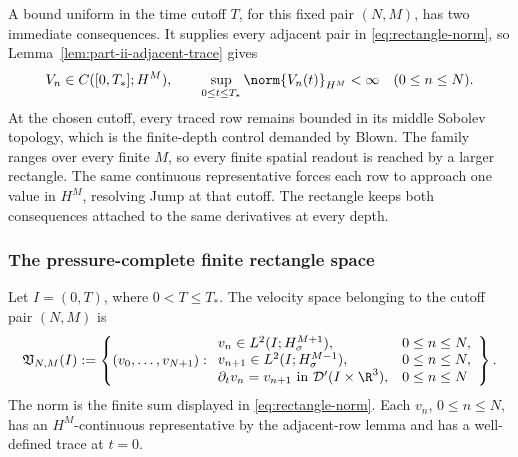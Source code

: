 A bound uniform in the time cutoff \(T\), for this fixed pair \((N,M)\), has
two immediate consequences.  It supplies every adjacent pair in
\eqref{eq:rectangle-norm}, so Lemma~\ref{lem:part-ii-adjacent-trace} gives
\begin{equation*}
 V_n\in C([0,T_*];H^M),
 \qquad
 \sup_{0\le t\le T_*}\norm{V_n(t)}_{H^M}<\infty
 \quad(0\le n\le N).
\end{equation*}
At the chosen cutoff, every traced row remains bounded in its middle Sobolev
topology, which is the finite-depth control demanded by Blown.  The family
ranges over every finite \(M\), so every finite spatial readout is reached by
a larger rectangle.  The same continuous representative forces each row to
approach one value in \(H^M\), resolving Jump at that cutoff.  The rectangle
keeps both consequences attached to the same derivatives at every depth.

\subsubsection{The pressure-complete finite rectangle space}

Let \(I=(0,T)\), where \(0<T\le T_*\).  The velocity space belonging to
the cutoff pair \((N,M)\) is
\begin{equation*}
 \mathfrak V_{N,M}(I)
 :=\left\{
 (v_0,\ldots,v_{N+1}):
 \begin{array}{ll}
 v_n\in L^2(I;H^{M+1}_\sigma),&0\le n\le N,\\
 v_{n+1}\in L^2(I;H^{M-1}_\sigma),&0\le n\le N,\\
 \partial_tv_n=v_{n+1}\text{ in }\mathcal D'(I\times\R^3),&0\le n\le N
 \end{array}
 \right\}.
\end{equation*}
The norm is the finite sum displayed in \eqref{eq:rectangle-norm}.  Each
\(v_n\), \(0\le n\le N\), has an \(H^M\)-continuous representative by the
adjacent-row lemma and has a well-defined trace at \(t=0\).

